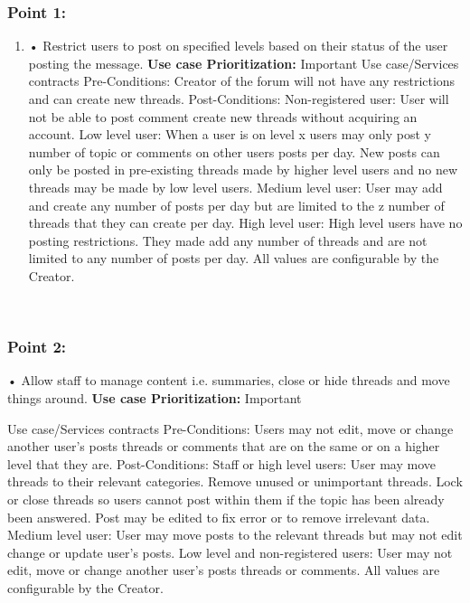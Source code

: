 \documentclass[11pt]{article}
\begin{document}
\subsubsection{Point 1:}
\begin{enumerate}
\item
•	Restrict users to post on specified levels based on their status of the user posting the message.
\newline
\textbf{Use case Prioritization:} Important
\newline
Use case/Services contracts
\newline
Pre-Conditions:
\newline
Creator of the forum will not have any restrictions and can create new threads.
\newline
Post-Conditions:
Non-registered user:
User will not be able to post comment create new threads without acquiring an account.
\newline
Low level user:
When a user is on level x users may only post y number of topic or comments on other users posts per day. New posts can only be posted in pre-existing threads made by higher level users and no new threads may be made by low level users. 
\newline
Medium level user:
User may add and create any number of posts per day but are limited to the z number of threads that they can create per day.
\newline
High level user:
High level users have no posting restrictions. They made add any number of threads and are not limited to any number of posts per day.
 \newline
 All values are configurable by the Creator.
 \newline
 \end{enumerate}
 
\subsubsection{Point 2:}
•	Allow staff to manage content i.e. summaries, close or hide threads and move things around.
\newline
\textbf{Use case Prioritization:} Important
	

Use case/Services contracts
\newline
Pre-Conditions:
\newline
Users may not edit, move or change another user’s posts threads or comments that are on the same or on a higher level that they are.
\newline
Post-Conditions:
\newline
Staff or high level users:
User may move threads to their relevant categories. Remove unused or unimportant threads. Lock or close threads so users cannot post within them if the topic has been already been answered. Post may be edited to fix error or to remove irrelevant data.
\newline
Medium level user:
User may move posts to the relevant threads but may not edit change or update user’s posts.
\newline
Low level and non-registered users:
User may not edit, move or change another user’s posts threads or comments.
\newline
All values are configurable by the Creator.
\newline
 
\end{document}
